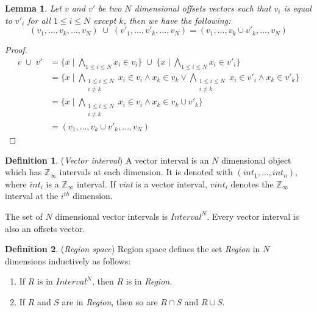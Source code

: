 \documentclass{article}
\theoremstyle{definition}
\newtheorem{defn}{Definition}
\theoremstyle{plain}
\newtheorem{lem}{Lemma}
\theoremstyle{remark}
\newcommand{\zinf}{\textnormal{$\mathbb{Z}_\infty$}}
\begin{document}
\begin{lem}{}\label{lem:vector-union}
  Let $v$ and $v'$ be two $N$ dimensional offsets vectors such that $v_i$ is
  equal to $v'_i$ for all $1 \leq i \leq N$ except $k$, then we have the
  following:
%
  \begin{equation*}
    (v_1,\dotsc, v_k,\dotsc, v_N) \; \cup \; (v'_1,\dotsc, v'_k, \dotsc, v_N)
    =
    (v_1,\dotsc, v_k \cup v'_k,\dotsc, v_N)
  \end{equation*}
\end{lem}
%
\begin{proof}
  \begin{align*}
    v \; \cup \; v' &
    = \{x \mid
          \bigwedge_{1 \leq i \leq N } x_i \in v_i \}
      \;\cup\;
      \{x \mid
          \bigwedge_{1 \leq i \leq N } x_i \in v'_i \} \\
    & = \{x \mid
          \bigwedge_{\substack{1 \leq i \leq N \\ i \neq k}} x_i \in v_i
              \wedge x_k \in v_k \vee
          \bigwedge_{\substack{1 \leq i \leq N \\ i \neq k}} x_i \in v'_i
            \wedge x_k \in v'_k
        \} \\
    & = \{x \mid
          \bigwedge_{\substack{1 \leq i \leq N \\ i \neq k}} x_i \in v_i
          \wedge x_k \in v_k \cup v'_k
        \} \\
    & = (v_1,\dotsc, v_k \cup v'_k,\dotsc, v_N)
  \end{align*}
\end{proof}

\begin{defn}{(\emph{Vector interval})}
  A vector interval is an $N$ dimensional object which has \zinf{} intervals at
  each dimension. It is denoted with $(\textit{int}_1, \dots, \textit{int}_n)$,
  where $\textit{int}_i$ is a \zinf{} interval. If \textit{vint} is a vector
  interval, $\textit{vint}_i$ denotes the \zinf{} interval at the $i^{th}$
  dimension.

  The set of $N$ dimensional vector intervals is $\textit{Interval}^N$. Every
  vector interval is also an offsets vector.
\end{defn}

\begin{defn}{(\emph{Region space})}
  Region space defines the set \textit{Region} in $N$ dimensions inductively as
  follows:
%
  \begin{enumerate}
    \item If $R$ is in $\textit{Interval}^N$, then $R$ is in \textit{Region}.
    \item If $R$ and $S$ are in \textit{Region}, then so are $R \cap S$ and $R
      \cup S$.
  \end{enumerate}
\end{defn}
\end{document}
